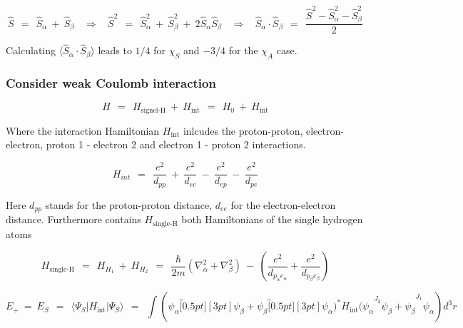 \documentclass[10pt]{report}
\numberwithin{equation}{chapter}
\begin{document}
\begin{equation}
  \hat{S} ~~=~~ \hat{S}_\alpha ~+~ \hat{S}_\beta ~~~~ \Rightarrow ~~~~ 
  \hat{S}^2 ~~=~~ \hat{S}^2_\alpha ~+~ \hat{S}^2_\beta ~+~ 2 \hat{S}_\alpha \hat{S}_\beta ~~~~ \Rightarrow ~~~~
  \hat{S}_\alpha \cdot \hat{S}_\beta ~~=~~ \frac{\hat{S}^2 - \hat{S}^2_\alpha - \hat{S}^2_\beta}{2}
\end{equation}


Calculating $\langle \hat{S}_\alpha \cdot \hat{S}_\beta \rangle$ leads to $1/4$ for $\chi_S$ and $-3/4$ for the $\chi_A$ case.


\subsubsection{Consider weak Coulomb interaction}


\begin{equation}
  H ~~=~~ H_\text{signel-H} ~+~ H_\text{int} ~~=~~ H_0 ~+~ H_\text{int}
\end{equation}

Where the interaction Hamiltonian $H_\text{int}$ inlcudes the proton-proton, electron-electron, proton 1 - electron 2 and electron 1 - proton 2 interactions.

\begin{equation}
  H_{int} ~~=~~ \frac{e^2}{d_{pp}} ~+~ \frac{e^2}{d_{ee}} ~-~ \frac{e^2}{d_{ep}} ~-~ \frac{e^2}{d_{pe}}
\end{equation}

Here $d_{pp}$ stands for the proton-proton distance, $d_{ee}$ for the electron-electron distance.
Furthermore contains $H_\text{single-H}$ both Hamiltonians of the single hydrogen atoms

\begin{equation}
  H_\text{single-H} ~~=~~ H_{H_1} ~+~ H_{H_2} ~~=~~ 
  \frac{\hbar}{2m} \left( \nabla^2_\alpha + \nabla^2_\beta \right) ~-~ 
  \left(\frac{e^2}{d_{p_\alpha e_\alpha}} + \frac{e^2}{d_{p_\beta e_\beta}} \right)
\end{equation}



\begin{equation}
  E_+ ~=~E_S ~~=~~ \langle \Psi_S | H_\text{int} | \Psi_S \rangle ~~=~~
  \int ( \psi_\alpha \overbracket[0.5pt][3pt]{ \psi_\beta + \psi_\beta \overbracket[0.5pt][3pt]{ \psi_\alpha )^* H_\text{int} 
  ( \psi_\alpha }^{J_2} \psi_\beta + \psi_\beta}^{J_1}  \psi_\alpha ) d^3r
\end{equation}
\end{document}
